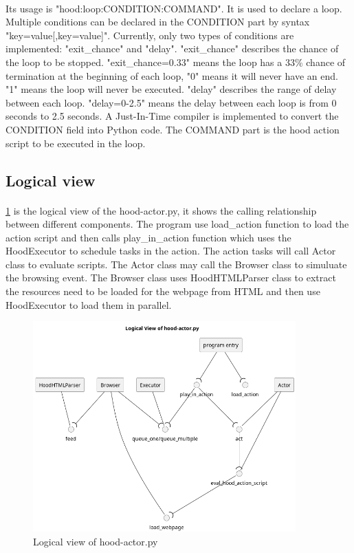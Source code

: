 \documentclass[mscthesis]{usiinfthesis}
\begin{document}
\paragraph{}
Its usage is "hood:loop:CONDITION:COMMAND". It is used to declare a loop. Multiple conditions can be declared in the CONDITION part by syntax "key=value[,key=value]". Currently, only two types of conditions are implemented: "exit\_chance" and "delay". "exit\_chance" describes the chance of the loop to be stopped. "exit\_chance=0.33" means the loop has a 33\% chance of termination at the beginning of each loop, "0" means it will never have an end. "1" means the loop will never be executed. "delay" describes the range of delay between each loop. "delay=0-2.5" means the delay between each loop is from 0 seconds to 2.5 seconds. A Just-In-Time compiler is implemented to convert the CONDITION field into Python code. The COMMAND part is the hood action script to be executed in the loop.

\subsection{Logical view}
\paragraph{}
\cref{fig:actor-logic-view} is the logical view of the hood-actor.py, it shows the calling relationship between different components. The program use load\_action function to load the action script and then calls play\_in\_action function which uses the HoodExecutor to schedule tasks in the action. The action tasks will call Actor class to evaluate scripts. The Actor class may call the Browser class to simuluate the browsing event. The Browser class uses HoodHTMLParser class to extract the resources need to be loaded for the webpage from HTML and then use HoodExecutor to load them in parallel.
\begin{figure}[H]
  \includegraphics[width=0.9\textwidth]{graphics/puml/actor.png}
  \caption{Logical view of hood-actor.py}
  \label{fig:actor-logic-view}
\end{figure}
\end{document}
